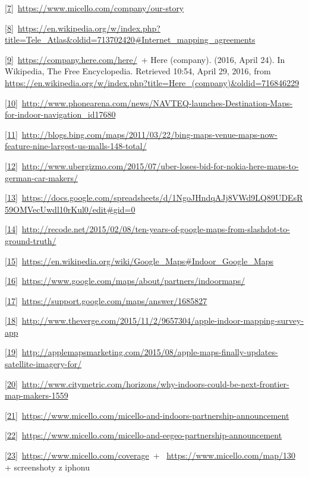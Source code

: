 \href{}{{[}7{]}}~\href{}{https://www.micello.com/company/our-story}~

\href{}{{[}8{]}}~\href{}{https://en.wikipedia.org/w/index.php?title=Tele\_Atlas\&oldid=713702420\#Internet\_mapping\_agreements}~

\href{}{{[}9{]}}~\href{}{https://company.here.com/here/}~+ Here (company). (2016, April 24). In Wikipedia, The Free Encyclopedia. Retrieved 10:54, April 29, 2016, from \href{}{https://en.wikipedia.org/w/index.php?title=Here\_(company)\&oldid=716846229}~

\href{}{{[}10{]}}~\href{}{http://www.phonearena.com/news/NAVTEQ-launches-Destination-Maps-for-indoor-navigation\_id17680}~

\href{}{{[}11{]}}~\href{}{http://blogs.bing.com/maps/2011/03/22/bing-maps-venue-maps-now-feature-nine-largest-us-malls-148-total/}~

\href{}{{[}12{]}}~\href{}{http://www.ubergizmo.com/2015/07/uber-loses-bid-for-nokia-here-maps-to-german-car-makers/}~

\href{}{{[}13{]}}~\href{}{https://docs.google.com/spreadsheets/d/1NgoJHndqAJj8VWd9LQ89UDEsR59OMVecUwdl10rKul0/edit\#gid=0}~

\href{}{{[}14{]}}~\href{}{http://recode.net/2015/02/08/ten-years-of-google-maps-from-slashdot-to-ground-truth/}~

\href{}{{[}15{]}}~\href{}{https://en.wikipedia.org/wiki/Google\_Maps\#Indoor\_Google\_Maps}~

\href{}{{[}16{]}}~\href{}{https://www.google.com/maps/about/partners/indoormaps/}~

\href{}{{[}17{]}}~\href{}{https://support.google.com/maps/answer/1685827}~

\href{}{{[}18{]}}~\href{}{http://www.theverge.com/2015/11/2/9657304/apple-indoor-mapping-survey-app}~

\href{}{{[}19{]}}~\href{}{http://applemapsmarketing.com/2015/08/apple-maps-finally-updates-satellite-imagery-for/}~

\href{}{{[}20{]}}~\href{}{http://www.citymetric.com/horizons/why-indoors-could-be-next-frontier-map-makers-1559}~

\href{}{{[}21{]}}~\href{}{https://www.micello.com/micello-and-indoors-partnership-announcement}~

\href{}{{[}22{]}}~\href{}{https://www.micello.com/micello-and-eegeo-partnership-announcement}~

\href{}{{[}23{]}}~\href{}{https://www.micello.com/coverage}~+ ~\href{}{https://www.micello.com/map/130}~ + screenshoty z iphonu

